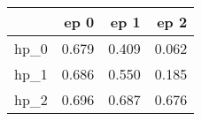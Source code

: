 \begin{tabular}{lrrr}
\toprule
{} &   ep 0 &   ep 1 &   ep 2 \\
\midrule
hp\_0 &  0.679 &  0.409 &  0.062 \\
hp\_1 &  0.686 &  0.550 &  0.185 \\
hp\_2 &  0.696 &  0.687 &  0.676 \\
\bottomrule
\end{tabular}
